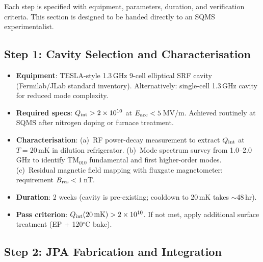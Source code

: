 \documentclass[11pt]{article}
\theoremstyle{definition}
\theoremstyle{remark}
\newcommand{\ee}[1]{\times 10^{#1}}
\begin{document}
Each step is specified with equipment, parameters, duration, and
verification criteria. This section is designed to be handed directly
to an SQMS experimentalist.

\subsection{Step 1: Cavity Selection and Characterisation}

\begin{itemize}[nosep]
\item \textbf{Equipment}: TESLA-style 1.3\,GHz 9-cell elliptical SRF
  cavity (Fermilab/JLab standard inventory). Alternatively: single-cell
  1.3\,GHz cavity for reduced mode complexity.
\item \textbf{Required specs}: $Q_{\rm int} > 2\ee{10}$ at
  $E_{\rm acc} < 5$\,MV/m. Achieved routinely at SQMS after nitrogen
  doping or furnace treatment.
\item \textbf{Characterisation}: (a)~RF power-decay measurement to extract
  $Q_{\rm int}$ at $T = 20$\,mK in dilution refrigerator. (b)~Mode
  spectrum survey from 1.0--2.0\,GHz to identify TM$_{010}$ fundamental
  and first higher-order modes. (c)~Residual magnetic field mapping
  with fluxgate magnetometer: requirement $B_{\rm res} < 1$\,nT.
\item \textbf{Duration}: 2 weeks (cavity is pre-existing; cooldown to
  20\,mK takes $\sim$48\,hr).
\item \textbf{Pass criterion}: $Q_{\rm int}(20\,\text{mK}) > 2\ee{10}$.
  If not met, apply additional surface treatment (EP + 120$^\circ$C bake).
\end{itemize}

\subsection{Step 2: JPA Fabrication and Integration}
\end{document}

